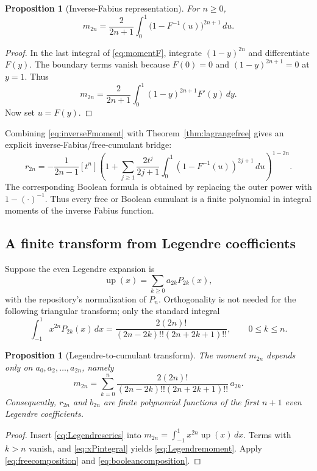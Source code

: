 \documentclass[11pt]{article}
\newtheorem{proposition}[theorem]{Proposition}
\theoremstyle{definition}
\newcommand{\Up}{\operatorname{up}}
\begin{document}
\begin{proposition}[Inverse-Fabius representation]\label{prop:inverseFmoment}
For \(n\ge0\),
\begin{equation}\label{eq:inverseFmoment}
m_{2n}=\frac{2}{2n+1}\int_0^1\bigl(1-F^{-1}(u)\bigr)^{2n+1}\,du.
\end{equation}
\end{proposition}
\begin{proof}
In the last integral of \eqref{eq:momentF}, integrate \((1-y)^{2n}\) and differentiate \(F(y)\). The boundary terms vanish because \(F(0)=0\) and \((1-y)^{2n+1}=0\) at \(y=1\). Thus
\[
m_{2n}=\frac{2}{2n+1}\int_0^1(1-y)^{2n+1}F'(y)\,dy.
\]
Now set \(u=F(y)\).
\end{proof}

Combining \eqref{eq:inverseFmoment} with Theorem~\ref{thm:lagrangefree} gives an explicit inverse-Fabius/free-cumulant bridge:
\begin{equation}\label{eq:inverseFfree}
r_{2n}=-\frac1{2n-1}[t^n]
\left(
1+\sum_{j\ge1}\frac{2t^j}{2j+1}
\int_0^1(1-F^{-1}(u))^{2j+1}\,du
\right)^{1-2n}.
\end{equation}
The corresponding Boolean formula is obtained by replacing the outer power with \(1-(\cdot)^{-1}\). Thus every free or Boolean cumulant is a finite polynomial in integral moments of the inverse Fabius function.

\subsection{A finite transform from Legendre coefficients}
Suppose the even Legendre expansion is
\begin{equation}\label{eq:Legendreseries}
\Up(x)=\sum_{k\ge0}a_{2k}P_{2k}(x),
\end{equation}
with the repository's normalization of \(P_n\). Orthogonality is not needed for the following triangular transform; only the standard integral
\begin{equation}\label{eq:xPintegral}
\int_{-1}^1x^{2n}P_{2k}(x)\,dx
=\frac{2(2n)!}{(2n-2k)!!(2n+2k+1)!!},
\qquad 0\le k\le n.
\end{equation}

\begin{proposition}[Legendre-to-cumulant transform]\label{prop:Legendretransform}
The moment \(m_{2n}\) depends only on \(a_0,a_2,\ldots,a_{2n}\), namely
\begin{equation}\label{eq:Legendremoment}
m_{2n}=\sum_{k=0}^n
\frac{2(2n)!}{(2n-2k)!!(2n+2k+1)!!}\,a_{2k}.
\end{equation}
Consequently, \(r_{2n}\) and \(b_{2n}\) are finite polynomial functions of the first \(n+1\) even Legendre coefficients.
\end{proposition}
\begin{proof}
Insert \eqref{eq:Legendreseries} into \(m_{2n}=\int_{-1}^1x^{2n}\Up(x)\,dx\). Terms with \(k>n\) vanish, and \eqref{eq:xPintegral} yields \eqref{eq:Legendremoment}. Apply \eqref{eq:freecomposition} and \eqref{eq:booleancomposition}.
\end{proof}
\end{document}
